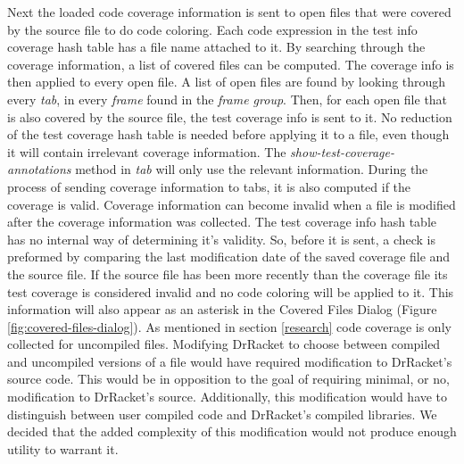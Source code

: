 Next the loaded code coverage information is sent to open files that were covered by the source file to do code coloring. Each code expression in the test info coverage hash table has a file name attached to it. By searching through the coverage information, a list of covered files can be computed. The coverage info is then applied to every open file. A list of open files are found by looking through every \emph{tab}, in every \emph{frame} found in the \emph{frame group}. Then, for each open file that is also covered by the source file, the test coverage info is sent to it. No reduction of the test coverage hash table is needed before applying it to a file, even though it will contain irrelevant coverage information. The \emph{show-test-coverage-annotations} method in \emph{tab} will only use the relevant information. During the process of sending coverage information to tabs, it is also computed if the coverage is valid. Coverage information can become invalid when a file is modified after the coverage information was collected. The test coverage info hash table has no internal way of determining it's validity. So, before it is sent, a check is preformed by comparing the last modification date of the saved coverage file and the source file. If the source file has been more recently than the coverage file its test coverage is considered invalid and no code coloring will be applied to it. This information will also appear as an asterisk in the Covered Files Dialog (Figure \ref{fig:covered-files-dialog}). As mentioned in section \ref{research} code coverage is only collected for uncompiled files. Modifying DrRacket to choose between compiled and uncompiled versions of a file would have required modification to DrRacket's source code. This would be in opposition to the goal of requiring minimal, or no, modification to DrRacket's source. Additionally, this modification would have to distinguish between user compiled code and DrRacket's compiled libraries. We decided that the added complexity of this modification would not produce enough utility to warrant it. 


